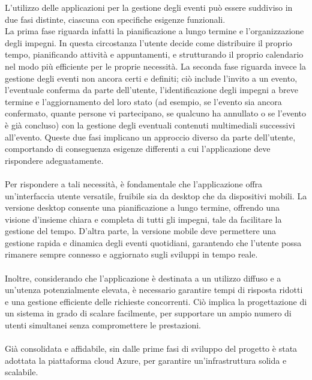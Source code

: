 L’utilizzo delle applicazioni per la gestione degli eventi può essere suddiviso in due fasi distinte, 
ciascuna con specifiche esigenze funzionali.\\
La prima fase riguarda infatti la pianificazione a lungo termine e l’organizzazione degli impegni.
In questa circostanza l’utente decide come distribuire il proprio tempo, pianificando attività e appuntamenti,
e strutturando il proprio calendario nel modo più efficiente per le proprie necessità.
La seconda fase riguarda invece la gestione degli eventi non ancora certi e definiti;
ciò include l’invito a un evento, l’eventuale conferma da parte dell’utente,
l’identificazione degli impegni a breve termine e l’aggiornamento del loro stato
(ad esempio, se l’evento sia ancora confermato, quante persone vi partecipano, se qualcuno ha annullato o se l'evento è già concluso)
con la gestione degli eventuali contenuti multimediali successivi all’evento. Queste due fasi implicano un approccio diverso da parte dell’utente,
comportando di conseguenza esigenze differenti a cui l’applicazione deve rispondere adeguatamente.\\
\\
Per rispondere a tali necessità, è fondamentale che l'applicazione offra un'interfaccia utente versatile, fruibile sia da desktop che da dispositivi mobili.
La versione desktop consente una pianificazione a lungo termine, offrendo una visione d'insieme chiara e completa di tutti gli impegni,
tale da facilitare la gestione del tempo.
D'altra parte, la versione mobile deve permettere una gestione rapida e dinamica degli eventi quotidiani,
garantendo che l'utente possa rimanere sempre connesso e aggiornato sugli sviluppi in tempo reale.\\
\\
Inoltre, considerando che l'applicazione è destinata a un utilizzo diffuso e a un'utenza potenzialmente elevata,
è necessario garantire tempi di risposta ridotti e una gestione efficiente delle richieste concorrenti.
Ciò implica la progettazione di un sistema in grado di scalare facilmente,
per supportare un ampio numero di utenti simultanei senza compromettere le prestazioni.\\
\\
Già consolidata e affidabile, sin dalle prime fasi di sviluppo del progetto è stata adottata la piattaforma cloud Azure, per garantire un'infrastruttura solida e scalabile.
\clearpage


